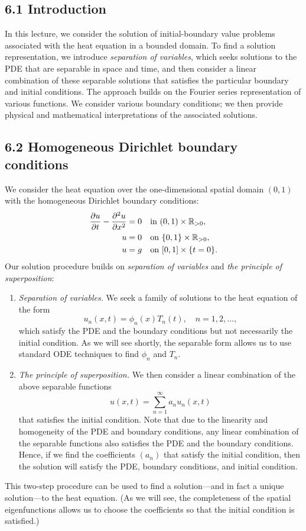 

\subsection{6.1 Introduction}
In this lecture, we consider the solution of initial-boundary value problems associated with the heat equation in a bounded domain. To find a solution representation, we introduce \textit{separation of variables}, which seeks solutions to the PDE that are separable in space and time, and then consider a linear combination of these separable solutions that satisfies the particular boundary and initial conditions. The approach builds on the Fourier series representation of various functions. We consider various boundary conditions; we then provide physical and mathematical interpretations of the associated solutions.

\subsection{6.2 Homogeneous Dirichlet boundary conditions}
We consider the heat equation over the one-dimensional spatial domain $(0, 1)$ with the homogeneous Dirichlet boundary conditions:
\begin{align*}
    \frac{\partial u}{\partial t} - \frac{\partial^2 u}{\partial x^2} &= 0 \quad \text{in } (0, 1) \times \mathbb{R}_{>0}, \\
    u &= 0 \quad \text{on } \{0, 1\} \times \mathbb{R}_{>0}, \\
    u &= g \quad \text{on } [0, 1] \times \{t = 0\}.
\end{align*}
Our solution procedure builds on \textit{separation of variables} and \textit{the principle of superposition}:
\begin{enumerate}
    \item \textit{Separation of variables.} We seek a family of solutions to the heat equation of the form
    \[u_n(x, t) = \phi_n(x) T_n(t), \quad n = 1, 2, \dots,\]
    which satisfy the PDE and the boundary conditions but not necessarily the initial condition. As we will see shortly, the separable form allows us to use standard ODE techniques to find $\phi_n$ and $T_n$.
    \item \textit{The principle of superposition.} We then consider a linear combination of the above separable functions
    \[u(x, t) = \sum_{n=1}^{\infty} a_n u_n(x, t)\]
    that satisfies the initial condition. Note that due to the linearity and homogeneity of the PDE and boundary conditions, any linear combination of the separable functions also satisfies the PDE and the boundary conditions. Hence, if we find the coefficients $(a_n)$ that satisfy the initial condition, then the solution will satisfy the PDE, boundary conditions, and initial condition.
\end{enumerate}
This two-step procedure can be used to find a solution---and in fact a unique solution---to the heat equation. (As we will see, the completeness of the spatial eigenfunctions allows us to choose the coefficients so that the initial condition is satisfied.)

